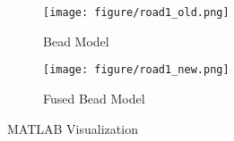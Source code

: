 \begin{comment}

\end{comment}
\begin{figure}
    \centering
    \begin{subfigure}[b]{0.2\textwidth}
                \texttt{[image: figure/road1\_old.png]}
                \caption{Bead Model}
                \label{road1:old}
    \end{subfigure}%
    \begin{subfigure}[b]{0.2\textwidth}
                \texttt{[image: figure/road1\_new.png]}
                \caption{Fused Bead Model}
                \label{road1:new}
    \end{subfigure}%
    \caption{MATLAB Visualization}
    \label{road1}
\end{figure}

